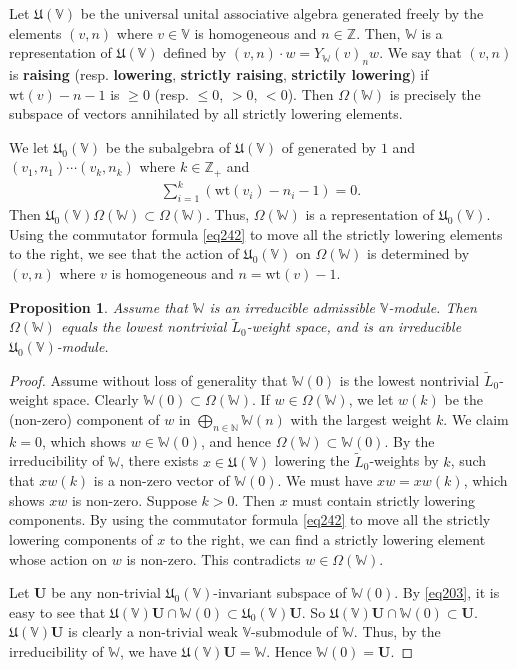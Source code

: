 \documentclass[12pt,b5paper,notitlepage]{report}
\theoremstyle{definition}
\theoremstyle{plain}
\newtheorem{pp}[df]{Proposition}
\newcommand{\fk}{\mathfrak}
\newcommand{\wtd}{\widetilde}
\newcommand{\mbf}{\mathbf}
\newcommand{\Vbb}{\mathbb V}
\newcommand{\Wbb}{\mathbb W}
\newcommand{\Nbb}{\mathbb N}
\newcommand{\Zbb}{\mathbb Z}
\newcommand{\wt}{\mathrm{wt}}
\numberwithin{equation}{section}
\begin{document}
Let $\fk U(\Vbb)$ be the universal unital associative algebra generated freely by the elements $(v,n)$ where $v\in\Vbb$ is homogeneous and $n\in\Zbb$. \index{UV@$\fk U(\Vbb),\fk U_0(\Vbb)$} Then, $\Wbb$ is a representation of $\fk U(\Vbb)$ defined by $(v,n)\cdot w=Y_\Wbb(v)_nw$. We say that $(v,n)$ is \textbf{raising} (resp. \textbf{lowering}, \textbf{strictly raising}, \textbf{strictily lowering}) if $\wt(v)-n-1$ is $\geq 0$ (resp. $\leq 0$, $>0$, $<0$). Then $\Omega(\Wbb)$ is precisely the subspace of vectors annihilated by all strictly lowering elements.

We let $\fk U_0(\Vbb)$ be the subalgebra of $\fk U(\Vbb)$ of generated by $1$ and $(v_1,n_1)\cdots (v_k,n_k)$ where $k\in\Zbb_+$ and 
\begin{align*}
\sum_{i=1}^k (\wt(v_i)-n_i-1)=0.
\end{align*}
Then $\fk U_0(\Vbb)\Omega(\Wbb)\subset\Omega(\Wbb)$. Thus, $\Omega(\Wbb)$ is a representation of $\fk U_0(\Vbb)$. Using the commutator formula \eqref{eq242} to move all the strictly lowering elements to the right, we see that the action of $\fk U_0(\Vbb)$ on $\Omega(\Wbb)$ is determined by $(v,n)$ where $v$ is homogeneous and $n=\wt(v)-1$.

\begin{pp}\label{lb98}
Assume that $\Wbb$ is an irreducible admissible $\Vbb$-module. Then $\Omega(\Wbb)$ equals the lowest nontrivial $\wtd L_0$-weight space, and  is an irreducible $\fk U_0(\Vbb)$-module.
\end{pp}
\begin{proof}
Assume without loss of generality that $\Wbb(0)$ is the lowest nontrivial $\wtd L_0$-weight space. Clearly $\Wbb(0)\subset \Omega(\Wbb)$. If $w\in\Omega(\Wbb)$, we let $w(k)$ be the (non-zero) component of $w$ in $\bigoplus_{n\in\Nbb}\Wbb(n)$ with the largest weight $k$. We claim $k=0$, which shows $w\in\Wbb(0)$, and hence $\Omega(\Wbb)\subset\Wbb(0)$. By the irreducibility of $\Wbb$, there exists  $x\in\fk U(\Vbb)$ lowering the $\wtd L_0$-weights by $k$, such that $xw(k)$ is a non-zero vector of $\Wbb(0)$. We must have $xw=xw(k)$, which shows $xw$ is  non-zero.  Suppose $k>0$. Then $x$ must contain strictly lowering components. By using the commutator formula \eqref{eq242} to move all the strictly lowering components of $x$ to the right, we can find a strictly lowering element whose action on $w$ is non-zero. This contradicts $w\in\Omega(\Wbb)$.


Let $\mbf U$ be any non-trivial $\fk U_0(\Vbb)$-invariant subspace of $\Wbb(0)$. By \eqref{eq203}, it is easy to see that $\fk U(\Vbb)\mbf U\cap \Wbb(0)\subset\fk U_0(\Vbb)\mbf U$. So $\fk U(\Vbb)\mbf U\cap \Wbb(0)\subset\mbf U$. $\fk U(\Vbb)\mbf U$ is clearly a non-trivial weak $\Vbb$-submodule of $\Wbb$. Thus, by the irreducibility of $\Wbb$, we have $\fk U(\Vbb)\mbf U=\Wbb$. Hence $\Wbb(0)=\mbf U$. 
\end{proof}
\end{document}
